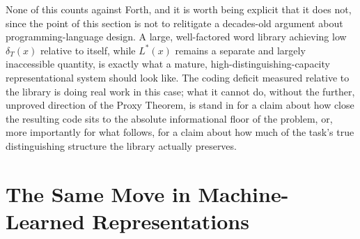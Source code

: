 \documentclass[11pt]{article}
\theoremstyle{plain}
\begin{document}
None of this counts against Forth, and it is worth being explicit that it does not, since the point of this section is not to relitigate a decades-old argument about programming-language design. A large, well-factored word library achieving low $\delta_T(x)$ relative to itself, while $L^*(x)$ remains a separate and largely inaccessible quantity, is exactly what a mature, high-distinguishing-capacity representational system should look like. The coding deficit measured relative to the library is doing real work in this case; what it cannot do, without the further, unproved direction of the Proxy Theorem, is stand in for a claim about how close the resulting code sits to the absolute informational floor of the problem, or, more importantly for what follows, for a claim about how much of the task's true distinguishing structure the library actually preserves.

\section{The Same Move in Machine-Learned Representations}
\label{sec:ml}
\end{document}
